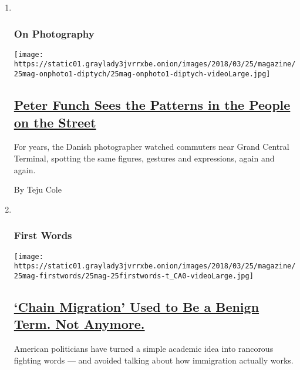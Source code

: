 \begin{enumerate}
\def\labelenumi{\arabic{enumi}.}
\item ~
  \hypertarget{on-photography}{%
  \subsubsection{On Photography}\label{on-photography}}

  \texttt{[image: https://static01.graylady3jvrrxbe.onion/images/2018/03/25/magazine/25mag-onphoto1-diptych/25mag-onphoto1-diptych-videoLarge.jpg]}

  \hypertarget{peter-funch-sees-the-patterns-in-the-people-on-the-street}{%
  \subsection{\texorpdfstring{\href{/2018/03/20/magazine/peter-funch-sees-the-patterns-in-the-people-on-the-street.html}{Peter
  Funch Sees the Patterns in the People on the
  Street}}{Peter Funch Sees the Patterns in the People on the Street}}\label{peter-funch-sees-the-patterns-in-the-people-on-the-street}}

  For years, the Danish photographer watched commuters near Grand
  Central Terminal, spotting the same figures, gestures and expressions,
  again and again.

  By Teju Cole
\item ~
  \hypertarget{first-words}{%
  \subsubsection{First Words}\label{first-words}}

  \texttt{[image: https://static01.graylady3jvrrxbe.onion/images/2018/03/25/magazine/25mag-firstwords/25mag-25firstwords-t\_CA0-videoLarge.jpg]}

  \hypertarget{chain-migration-used-to-be-a-benign-term-not-anymore}{%
  \subsection{\texorpdfstring{\href{/2018/03/20/magazine/chain-migration-used-to-be-a-benign-term-not-anymore.html}{`Chain
  Migration' Used to Be a Benign Term. Not
  Anymore.}}{`Chain Migration' Used to Be a Benign Term. Not Anymore.}}\label{chain-migration-used-to-be-a-benign-term-not-anymore}}

  American politicians have turned a simple academic idea into rancorous
  fighting words --- and avoided talking about how immigration actually
  works.


\end{enumerate}
